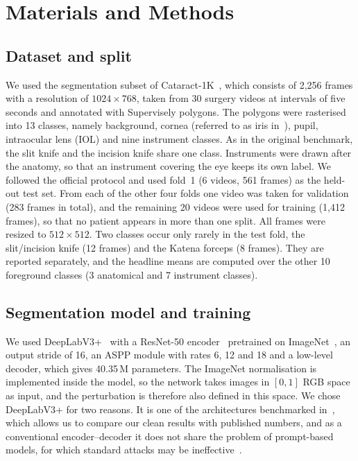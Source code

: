 \documentclass[conference]{IEEEtran}
\begin{document}
\section{Materials and Methods}

\subsection{Dataset and split}
We used the segmentation subset of Cataract-1K~\cite{ghamsarian2024cataract}, which consists of 2,256 frames with a resolution of $1024\times768$, taken from 30 surgery videos at intervals of five seconds and annotated with Supervisely polygons. The polygons were rasterised into 13 classes, namely background, cornea (referred to as iris in~\cite{ghamsarian2024cataract}), pupil, intraocular lens (IOL) and nine instrument classes. As in the original benchmark, the slit knife and the incision knife share one class. Instruments were drawn after the anatomy, so that an instrument covering the eye keeps its own label. We followed the official protocol and used fold~1 (6 videos, 561 frames) as the held-out test set. From each of the other four folds one video was taken for validation (283 frames in total), and the remaining 20 videos were used for training (1,412 frames), so that no patient appears in more than one split. All frames were resized to $512\times512$. Two classes occur only rarely in the test fold, the slit/incision knife (12 frames) and the Katena forceps (8 frames). They are reported separately, and the headline means are computed over the other 10 foreground classes (3 anatomical and 7 instrument classes).

\subsection{Segmentation model and training}
We used DeepLabV3+~\cite{chen2018encoder} with a ResNet-50 encoder~\cite{he2016deep} pretrained on ImageNet~\cite{deng2009imagenet}, an output stride of 16, an ASPP module with rates 6, 12 and 18 and a low-level decoder, which gives 40.35\,M parameters. The ImageNet normalisation is implemented inside the model, so the network takes images in $[0,1]$ RGB space as input, and the perturbation is therefore also defined in this space. We chose DeepLabV3+ for two reasons. It is one of the architectures benchmarked in~\cite{ghamsarian2024cataract}, which allows us to compare our clean results with published numbers, and as a conventional encoder--decoder it does not share the problem of prompt-based models, for which standard attacks may be ineffective~\cite{liu2024region}.
\end{document}
